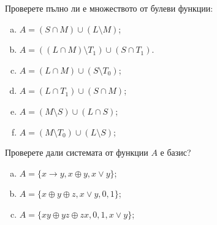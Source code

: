 \begin{problem} %
  Проверете пълно ли е множеството от булеви функции:
  \begin{enumerate}[a)]
  \item
    $A = (S\cap M)\cup(L\setminus M)$;
  \item
    $A = ((L\cap M)\setminus T_1)\cup (S\cap T_1)$.
  \item
    $A = (L\cap M)\cup (S\setminus T_0)$;
  \item
    $A = (L\cap T_1)\cup (S\cap M)$;
  \item
    $A = (M\setminus S)\cup(L\cap S)$;
  \item
    $A = (M\setminus T_0)\cup (L\setminus S)$;
  \end{enumerate}
\end{problem}

\begin{problem}
  Проверете дали системата от функции $A$ е базис?
  \begin{enumerate}[a)]
  \item
    $A = \{x\rightarrow y, x\oplus y, x\vee y\}$;
  \item
    $A = \{x\oplus y\oplus z, x\vee y, 0, 1\}$;
  \item
    $A = \{xy\oplus yz\oplus zx, 0, 1, x\vee y\}$;
  \end{enumerate}
\end{problem}

